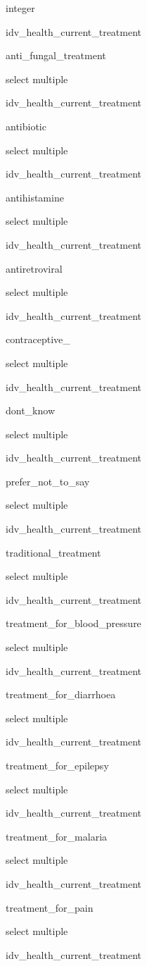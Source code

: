 \documentclass[]{article}
\begin{document}
integer

idv\_health\_current\_treatment

anti\_fungal\_treatment

select multiple

idv\_health\_current\_treatment

antibiotic

select multiple

idv\_health\_current\_treatment

antihistamine

select multiple

idv\_health\_current\_treatment

antiretroviral

select multiple

idv\_health\_current\_treatment

contraceptive\_

select multiple

idv\_health\_current\_treatment

dont\_know

select multiple

idv\_health\_current\_treatment

prefer\_not\_to\_say

select multiple

idv\_health\_current\_treatment

traditional\_treatment

select multiple

idv\_health\_current\_treatment

treatment\_for\_blood\_pressure

select multiple

idv\_health\_current\_treatment

treatment\_for\_diarrhoea

select multiple

idv\_health\_current\_treatment

treatment\_for\_epilepsy

select multiple

idv\_health\_current\_treatment

treatment\_for\_malaria

select multiple

idv\_health\_current\_treatment

treatment\_for\_pain

select multiple

idv\_health\_current\_treatment
\end{document}
